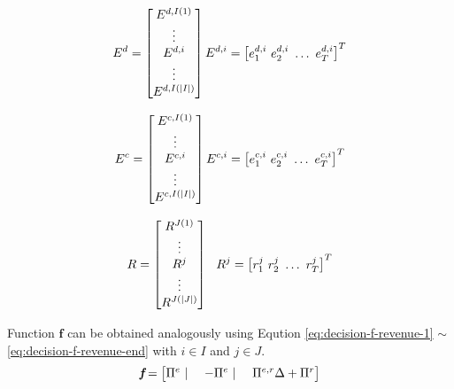\begin{equation}
E^d =
\begin{bmatrix}
E^{d,I(1)} \\ \vdots \\ E^{d,i} \\ \vdots \\ E^{d,I(|I|)}
\end{bmatrix} \\
E^{d,i} = 
\begin{bmatrix}
e_1^{d,i}~e_2^{d,i}~\dots~e_T^{d,i}
\end{bmatrix}^T
\end{equation}

\begin{equation}
E^c =
\begin{bmatrix}
E^{c,I(1)} \\ \vdots \\ E^{c,i} \\ \vdots\\ E^{c,I(|I|)}
\end{bmatrix} \\
E^{c,i} = 
\begin{bmatrix}
e_1^{c,i}~e_2^{c,i}~\dots~e_T^{c,i}
\end{bmatrix}^T
\end{equation}

\begin{equation}
\label{eq:decision-variable-end}
R =
\begin{bmatrix}
R^{J(1)} \\ \vdots \\R^{j} \\ \vdots \\ R^{J(|J|)}
\end{bmatrix} ~~~\\
R^{j} = 
\begin{bmatrix}
r_1^{j}~r_2^{j}~\dots~r_T^{j}
\end{bmatrix}^T
\end{equation}

Function $\textbf{f}$ can be obtained analogously using Eqution \eqref{eq:decision-f-revenue-1} $\sim$ \eqref{eq:decision-f-revenue-end} with $i \in I$ and $j \in J$.
\begin{equation}
\label{eq:decision-f-revenue-1}
\textit{\textbf{f}} =
\begin{bmatrix}
\Pi^e~|~&-\Pi^e~|~&\Pi^{e,r} \Delta + \Pi^r
\end{bmatrix}
\end{equation}

